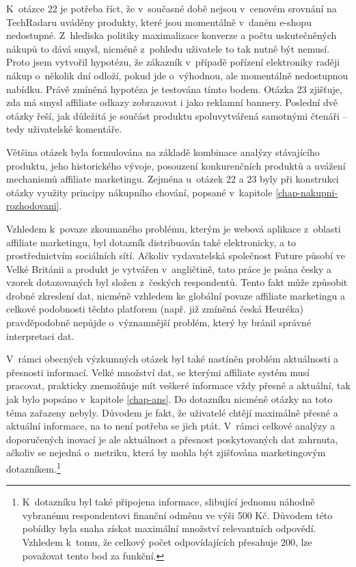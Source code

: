 \documentclass[12pt,twoside,openany]{fithesis}
\begin{document}
K~otázce 22 je potřeba říct, že v~současné době nejsou v~cenovém 
srovnání na TechRadaru uváděny produkty, které jsou momentálně v~daném 
e-shopu nedostupné. Z~hlediska politiky maximalizace konverze a počtu 
uskutečněných nákupů to dává smysl, nicméně z~pohledu uživatele to 
tak nutně být nemusí. Proto jsem vytvořil hypotézu, že zákazník 
v~případě pořízení elektroniky raději nákup o~několik dní odloží, 
pokud jde o~výhodnou, ale momentálně nedostupnou nabídku. Právě 
zmíněná hypotéza je testována tímto bodem. Otázka 23 zjišťuje, zda má 
smysl affiliate odkazy zobrazovat i jako reklamní bannery. Poslední dvě 
otázky řeší, jak důležitá je součást produktu spoluvytvářená 
samotnými čtenáři -- tedy uživatelské komentáře.

Většina otázek byla formulována na základě kombinace analýzy 
stávajícího produktu, jeho historického vývoje, posouzení konkurenčních 
produktů a uvážení mechanismů affiliate marketingu. Zejména u~otázek 22 
a 23 byly při konstrukci otázky využity principy nákupního chování, 
popsané v~kapitole 
\hyperlink{chap-nakupni-rozhodovani}{{\ref{chap-nakupni-rozhodovani}}}.

Vzhledem k~povaze zkoumaného problému, kterým je webová aplikace z~oblasti 
affiliate marketingu, byl dotazník distribuován také elektronicky, a to 
prostřednictvím sociálních sítí. Ačkoliv vydavatelská společnost 
Future působí ve Velké Británii a produkt je vytvářen v~angličtině, 
tato práce je psána česky a vzorek dotazovaných byl složen z~českých 
respondentů. Tento fakt může způsobit drobné zkreslení dat, nicméně 
vzhledem ke globální povaze affiliate marketingu a celkové podobnosti 
těchto platforem (např. již zmíněná česká Heuréka) pravděpodobně 
nepůjde o~významnější problém, který by bránil správné interpretaci 
dat. %

V~rámci obecných výzkumných otázek byl také nastíněn problém 
aktuálnosti a přesnosti informací. Velké množství dat, se kterými 
affiliate systém musí pracovat, prakticky znemožňuje mít veškeré 
informace vždy přesné a aktuální, tak jak bylo popsáno v~kapitole 
\hyperlink{chap-ans}{{\ref{chap-ans}}}. Do dotazníku nicméně otázky na toto 
téma zařazeny nebyly. Důvodem je fakt, že uživatelé chtějí maximálně 
přesné a aktuální informace, na to není potřeba se jich ptát. V~rámci 
celkové analýzy a doporučených inovací je ale aktuálnost a přesnost 
poskytovaných dat zahrnuta, ačkoliv se nejedná o~metriku, která by mohla 
být zjišťována marketingovým 
dotazníkem.\footnote{
    K~dotazníku byl také připojena informace, slibující jednomu náhodně 
vybranému respondentovi finanční odměnu ve výši 500 Kč. Důvodem této 
pobídky byla snaha získat maximální množství relevantních odpovědí. 
Vzhledem k~tomu, že celkový počet odpovídajících přesahuje 200, lze 
považovat tento bod za funkční.
}
\end{document}
